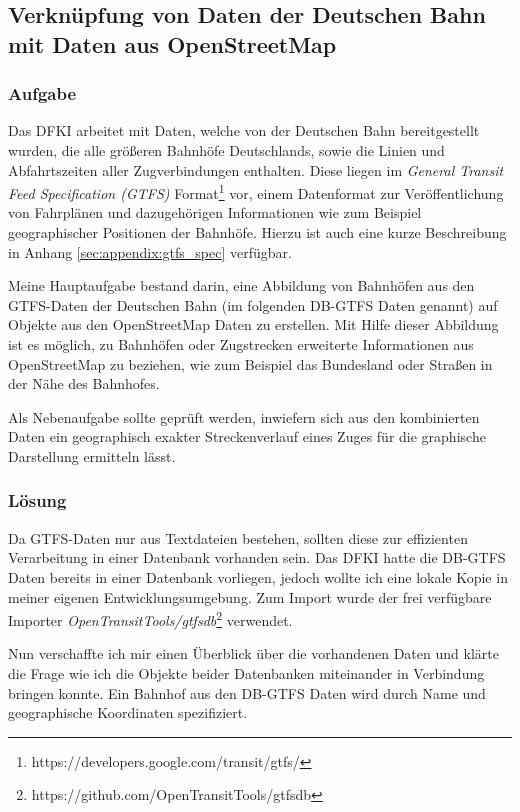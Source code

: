 \subsection{Verknüpfung von Daten der Deutschen Bahn mit Daten aus OpenStreetMap}
\subsubsection{Aufgabe}
Das DFKI arbeitet mit Daten, welche von der Deutschen Bahn bereitgestellt wurden, die alle größeren Bahnhöfe Deutschlands, sowie die Linien und Abfahrtszeiten aller Zugverbindungen enthalten.
Diese liegen im \textit{General Transit Feed Specification (GTFS)} Format\footnote{https://developers.google.com/transit/gtfs/} vor, einem Datenformat zur Veröffentlichung von Fahrplänen und dazugehörigen Informationen wie zum Beispiel geographischer Positionen der Bahnhöfe. Hierzu ist auch eine kurze Beschreibung in Anhang \ref{sec:appendix:gtfs_spec} verfügbar.

Meine Hauptaufgabe bestand darin, eine Abbildung von Bahnhöfen aus den GTFS-Daten der Deutschen Bahn (im folgenden DB-GTFS Daten genannt) auf Objekte aus den OpenStreetMap Daten zu erstellen.
Mit Hilfe dieser Abbildung ist es möglich, zu Bahnhöfen oder Zugstrecken erweiterte Informationen aus OpenStreetMap zu beziehen, wie zum Beispiel das Bundesland oder Straßen in der Nähe des Bahnhofes.

Als Nebenaufgabe sollte geprüft werden, inwiefern sich aus den kombinierten Daten ein geographisch exakter Streckenverlauf eines Zuges für die graphische Darstellung ermitteln lässt.

\subsubsection{Lösung}
Da GTFS-Daten nur aus Textdateien bestehen, sollten diese zur effizienten Verarbeitung in einer Datenbank vorhanden sein.
Das DFKI hatte die DB-GTFS Daten bereits in einer Datenbank vorliegen, jedoch wollte ich eine lokale Kopie in meiner eigenen Entwicklungsumgebung.
Zum Import wurde der frei verfügbare Importer \textit{OpenTransitTools/gtfsdb}\footnote{https://github.com/OpenTransitTools/gtfsdb} verwendet.

Nun verschaffte ich mir einen Überblick über die vorhandenen Daten und klärte die Frage wie ich die Objekte beider Datenbanken miteinander in Verbindung bringen konnte.
Ein Bahnhof aus den DB-GTFS Daten wird durch Name und geographische Koordinaten spezifiziert.

